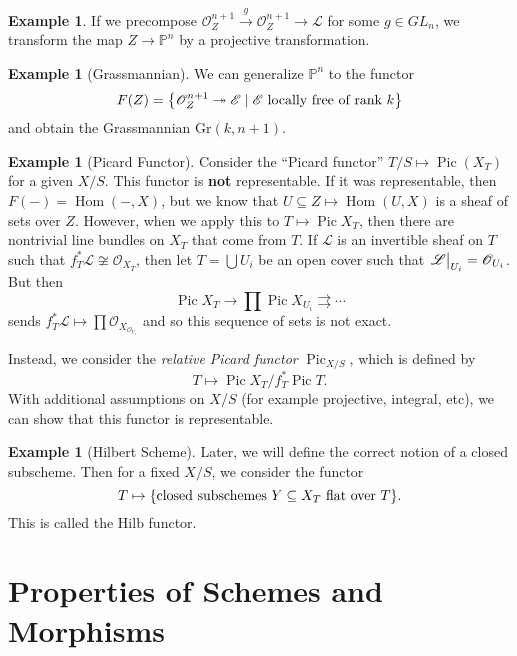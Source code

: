 \documentclass[leqno, openany]{memoir}
\theoremstyle{definition}
\newtheorem{exm}[thm]{Example}
\theoremstyle{remark}
\theoremstyle{plain}
\theoremstyle{definition}
\theoremstyle{remark}
\renewcommand{\P}{\mathbb{P}}
\newcommand{\mr}[1]{\mathrm{#1}}
\newcommand{\msc}[1]{\mathscr{#1}}
\DeclareMathOperator{\Hom}{Hom}
\DeclareMathOperator{\Pic}{Pic}
\begin{document}
\begin{exm}
    If we precompose $\msc{O}_{Z}^{n+1} \xrightarrow{g} \msc{O}_Z^{n+1} \to \msc{L}$ for some $g \in GL_n$, we transform the map $Z \to \P^n$ by a projective transformation.
\end{exm}

\begin{exm}[Grassmannian]
    We can generalize $\P^n$ to the functor
    \[ F(Z) = \qty{\msc{O}_Z^{n+1} \twoheadrightarrow \msc{E} \mid \msc{E}\ \text{locally free of rank $k$}} \]
    and obtain the Grassmannian $\mr{Gr}(k, n+1)$.
\end{exm}

\begin{exm}[Picard Functor]
    Consider the ``Picard functor'' $T/S \mapsto \Pic(X_T)$ for a given $X/S$. This functor is \textbf{not} representable. If it was representable, then $F(-) = \Hom(-,X)$, but we know that $U \subseteq Z \mapsto \Hom(U,X)$ is a sheaf of sets over $Z$. However, when we apply this to $T \mapsto \Pic X_T$, then there are nontrivial line bundles on $X_T$ that come from $T$. If $\msc{L}$ is an invertible sheaf on $T$ such that $f^*_T \msc{L} \not\cong \msc{O}_{X_T}$, then let $T = \bigcup U_i$ be an open cover such that $\eval{\msc{L}}_{U_i} = \msc{O}_{U_i}$. But then
    \[ \Pic X_T \to \prod \Pic X_{U_i} \rightrightarrows \cdots \]
    sends $f_T^* \msc{L} \mapsto \prod \msc{O}_{X_{\msc{O}_{U_i}}}$ and so this sequence of sets is not exact.

    Instead, we consider the \textit{relative Picard functor} $\Pic_{X/S}$, which is defined by
    \[ T \mapsto \Pic X_T / f_T^* \Pic T. \]
    With additional assumptions on $X/S$ (for example projective, integral, etc), we can show that this functor is representable.
\end{exm}

\begin{exm}[Hilbert Scheme]
    Later, we will define the correct notion of a closed subscheme. Then for a fixed $X/S$, we consider the functor
    \[ T \mapsto \qty{\text{closed subschemes}\ Y \subseteq X_T\ \text{flat over $T$}}. \]
    This is called the $\mr{Hilb}$ functor.
\end{exm}

\section{Properties of Schemes and Morphisms}%
\label{sec:properties_of_schemes_and_morphisms}
\end{document}
